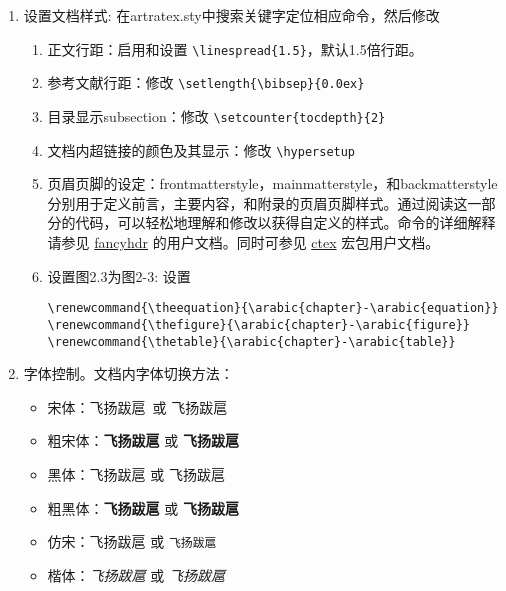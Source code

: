 \begin{enumerate}
        \verb+\chapter{item name}+  and \verb+\section*{item name}+

        来显式实现的 (请观察Backmatter.tex)，从而可以随意添加，放置，和修改，如同一般章节。对于图表目录名称则可在ucasthesis.cfg中进行修改。

    \item 设置文档样式: 在artratex.sty中搜索关键字定位相应命令，然后修改
        \begin{enumerate}
            \item 正文行距：启用和设置 \verb|\linespread{1.5}|，默认1.5倍行距。
            \item 参考文献行距：修改 \verb|\setlength{\bibsep}{0.0ex}|
            \item 目录显示subsection：修改 \verb|\setcounter{tocdepth}{2}|
            \item 文档内超链接的颜色及其显示：修改 \verb|\hypersetup|
            \item 页眉页脚的设定：frontmatterstyle，mainmatterstyle，和backmatterstyle分别用于定义前言，主要内容，和附录的页眉页脚样式。通过阅读这一部分的代码，可以轻松地理解和修改以获得自定义的样式。命令的详细解释请参见 \href{https://www.ctan.org/pkg/fancyhdr?lang=en}{fancyhdr} 的用户文档。同时可参见 \href{https://ctan.org/pkg/ctex?lang=en}{ctex} 宏包用户文档。

            \item 设置图2.3为图2-3: 设置
                {
                    \footnotesize
\begin{verbatim}
\renewcommand{\theequation}{\arabic{chapter}-\arabic{equation}}
\renewcommand{\thefigure}{\arabic{chapter}-\arabic{figure}}
\renewcommand{\thetable}{\arabic{chapter}-\arabic{table}}
\end{verbatim}
                }
        \end{enumerate}

    \item 字体控制。文档内字体切换方法：
        \begin{itemize}
            \item 宋体：飞扬跋扈~或 \textrm{飞扬跋扈}
            \item 粗宋体：{\bfseries 飞扬跋扈} 或 \textbf{飞扬跋扈}
            \item 黑体：{\sffamily 飞扬跋扈} 或 \textsf{飞扬跋扈}
            \item 粗黑体：{\bfseries\sffamily 飞扬跋扈} 或 \textsf{\bfseries 飞扬跋扈}
            \item 仿宋：{\ttfamily 飞扬跋扈} 或 \texttt{飞扬跋扈}
            \item 楷体：{\itshape 飞扬跋扈} 或 \textit{飞扬跋扈}
        \end{itemize}
        

\end{enumerate}
